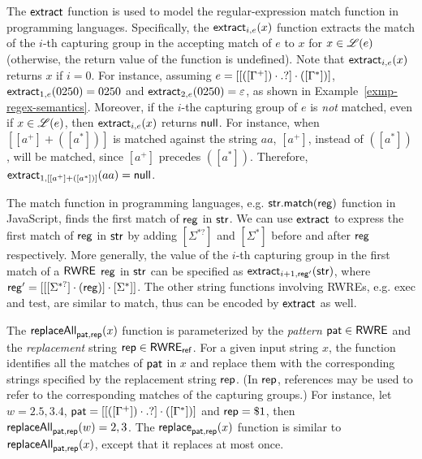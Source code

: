The $\mathsf{extract}$ function is used to model the regular-expression match function in programming languages.
Specifically, the $\mathsf{extract}_{i, e}(x)$ function extracts the match of the $i$-th capturing group in the accepting match of $e$ to $x$ for $x \in \mathscr{L}(e)$ (otherwise, the return value of the function is undefined). Note that $\mathsf{extract}_{i, e}(x)$ returns $x$ if $i=0$. For instance, assuming $e = [[([\Gamma^+])\cdot .?] \cdot ([\Gamma^*])]$,   $\mathsf{extract}_{1, e}(0250)=0250$ and $\mathsf{extract}_{2, e}(0250)=\varepsilon$, as shown in Example~\ref{exmp-regex-semantics}. Moreover, if the $i$-the capturing group of $e$ is \emph{not} matched, even if $x \in \mathscr{L}(e)$, then $\mathsf{extract}_{i, e}(x)$ returns $\mathsf{null}$. For instance, when $[[a^+] + ([a^*])]$ is matched against the string $aa$, $[a^+]$, instead of $([a^*])$, will be matched, since $[a^+]$ precedes $([a^*])$. Therefore, $\mathsf{extract}_{1, [[a^+] + ([a^*])]}(aa) = \mathsf{null}$.

\begin{remark}
The match function in programming languages, e.g. $\sf str.match(reg)$ function in JavaScript, finds the first match of $\sf reg$ in $\sf str$. We can use $\mathsf{extract}$ to express the first match of $\sf reg$ in $\sf str$ by adding $[\Sigma^{*?}]$ and $[\Sigma^*]$ before and after $\sf reg$ respectively. More generally, the value of the $i$-th capturing group in the first match of a ${\sf RWRE}$ $\sf reg$ in $\sf str$ can be specified as $\mathsf{extract}_{i+1, {\sf reg'}}({\sf str})$, where ${\sf reg'} = [[[\Sigma^{*?}] \cdot ({\sf reg})] \cdot [\Sigma^*]]$. The other string functions involving RWREs, e.g. {\sf exec} and {\sf test}, are similar to {\sf match}, thus can be encoded by $\mathsf{extract}$ as well. 
\end{remark}

The $\mathsf{replaceAll}_{\mathsf{pat}, \mathsf{rep}}(x)$ function is parameterized by the  %
\emph{pattern} $\mathsf{pat} \in {\sf RWRE}$ and the \emph{replacement} string $\mathsf{rep} \in {\sf RWRE_{ref}}$. For a given input string $x$, the function identifies all the %
matches of $\mathsf{pat}$ in $x$ and replace them with the corresponding strings specified by the replacement string $\mathsf{rep}$. (In $\mathsf{rep}$,  references may be used to refer to %
the corresponding matches of the capturing groups.)  For instance, let $w = 2.5, 3.4$, $\mathsf{pat} = [[([\Gamma^+])\cdot .?] \cdot ([\Gamma^*])]$ and $\mathsf{rep} = \$1$, then $\mathsf{replaceAll}_{\mathsf{pat}, \mathsf{rep}}(w) = 2, 3$. The $\mathsf{replace}_{\mathsf{pat}, \mathsf{rep}}(x)$ function is similar to $\mathsf{replaceAll}_{\mathsf{pat}, \mathsf{rep}}(x)$, except that it replaces at most once.

